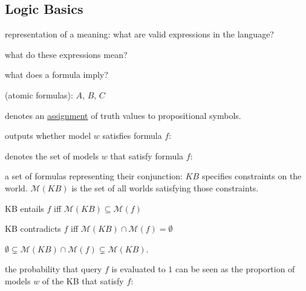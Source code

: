 \subsection{Logic Basics}

 representation of a meaning: what are valid expressions in the language?

 what do these expressions mean?

 what does a formula imply?

 (atomic formulas): $A$, $B$, $C$

 denotes an \underline{assignment} of truth values to
propositional symbols.

 outputs whether model $w$
satisfies formula $f$: 

 denotes the set of models $w$ that
satisfy formula $f$:

 a set of formulas representing their conjunction:
$KB$ specifies constraints on the world. $\mathcal{M}(KB)$ is the set of all
worlds satisfying those constraints.

 KB entails $f$ iff $\mathcal{M}(KB) \subseteq
\mathcal{M}(f)$ 

 KB contradicts $f$ iff $\mathcal{M}(KB) \cap \mathcal{M}(f)
= \emptyset$

 $\emptyset \subsetneq \mathcal{M}(KB) \cap \mathcal{M}(f) \subsetneq \mathcal{M}(KB)$.

 the probability that query $f$ is evaluated
to $1$ can be seen as the proportion of models $w$ of the KB that satisfy $f$:


